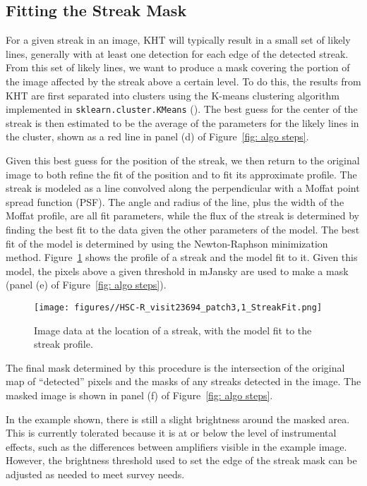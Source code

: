 \documentclass[DM,authoryear,toc]{lsstdoc}
\begin{document}
\subsection{Fitting the Streak Mask}
\label{sec: line fitting}

For a given streak in an image, KHT will typically result in a small set of likely lines, generally with at least one detection for each edge of the detected streak. From this set of likely lines, we want to produce a mask covering the portion of the image affected by the streak above a certain level. To do this, the results from KHT are first separated into clusters using the K-means clustering algorithm implemented in \texttt{sklearn.cluster.KMeans} (\citealt{Pedregosa:2011}). The best guess for the center of the streak is then estimated to be the average of the parameters for the likely lines in the cluster, shown as a red line in panel (d) of Figure~\ref{fig: algo steps}.

Given this best guess for the position of the streak, we then return to the original image to both refine the fit of the position and to fit its approximate profile. The streak is modeled as a line convolved along the perpendicular with a Moffat point spread function (PSF). The angle and radius of the line, plus the width of the Moffat profile, are all fit parameters, while the flux of the streak is determined by finding the best fit to the data given the other parameters of the model. The best fit of the model is determined by using the Newton-Raphson minimization method. Figure~\ref{fig: profile} shows the profile of a streak and the model fit to it. Given this model, the pixels above a given threshold in mJansky are used to make a mask (panel (e) of Figure~\ref{fig: algo steps}).
\begin{figure}
\texttt{[image: figures//HSC-R\_visit23694\_patch3,1\_StreakFit.png]}
\caption{Image data at the location of a streak, with the model fit to the streak profile.}
\label{fig: profile}
\end{figure}

The final mask determined by this procedure is the intersection of the original map of ``detected'' pixels and the masks of any streaks detected in the image. The masked image is shown in panel (f) of Figure~\ref{fig: algo steps}.

In the example shown, there is still a slight brightness around the masked area. This is currently tolerated because it is at or below the level of instrumental effects, such as the differences between amplifiers visible in the example image. However, the brightness threshold used to set the edge of the streak mask can be adjusted as needed to meet survey needs.
\end{document}
